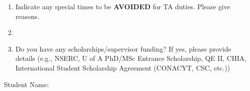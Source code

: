 \documentclass[10pt]{report}
\begin{document}
\begin{enumerate}
\item 
  Indicate any special times to be {\bf AVOIDED} for TA duties.
  Please give reasons.
  \TextField[maxlen=600,name=avoid,
    width=\linewidth,height=1cm,align=0,multiline=true]{\\}

\item 

\item
  Do you have any scholarships/supervisor funding?  If yes, please provide details  
  (e.g., NSERC, U of A PhD/MSc Entrance Scholarship, QE II, CHIA, International Student Scholarship Agreement (CONACYT, CSC, etc.))
  \TextField[maxlen=600,name=funding,
    width=\linewidth,height=1cm,align=0,multiline=true]{\\}
\end{enumerate}

\noindent Student Name: \TextField[maxlen=30,name=myname,align=0,width=\stringwidth]{}
\end{document}
